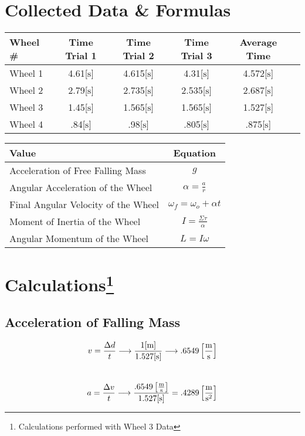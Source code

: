 \documentclass{article}
\begin{document}
\section{Collected Data \& Formulas}
\vspace{24pt}
\begin{center}
\large \begin{tabular}{|l|c|c|c|c|c|}
\hline
Wheel \# & Time Trial 1 & Time Trial 2 & Time Trial 3 & Average Time \\
\hline
Wheel 1 & 4.61[$\si{\second}$] & 4.615[$\si{\second}$] & 4.31[$\si{\second}$] & 4.572[$\si{\second}$]\\
\hline
Wheel 2 & 2.79[$\si{\second}$] & 2.735[$\si{\second}$] & 2.535[$\si{\second}$] & 2.687[$\si{\second}$]\\
\hline
Wheel 3 & 1.45[$\si{\second}$] & 1.565[$\si{\second}$] & 1.565[$\si{\second}$] & 1.527[$\si{\second}$]\\
\hline
Wheel 4 & .84[$\si{\second}$] & .98[$\si{\second}$] & .805[$\si{\second}$] & .875[$\si{\second}$]\\
\hline
\end{tabular}

\large
\vspace{24pt}
\begin{tabular}{|l|c|}
\hline
    Value & Equation \\
    \hline
    Acceleration of Free Falling Mass & $g$\\
    \hline
    Angular Acceleration of the Wheel & $\alpha = \frac{a}{r}$\\
    \hline
    Final Angular Velocity of the Wheel & $\omega_f = \omega_o+\alpha t$\\
    \hline
    Moment of Inertia of the Wheel & $I =\frac{ \Sigma \tau}{\alpha}$\\
    \hline
    Angular Momentum of the Wheel & $L=I\omega$\\
    \hline
\end{tabular}

\end{center}
\vspace{24pt}
\section{Calculations\protect\footnote{Calculations performed with Wheel 3 Data}}
\subsection{Acceleration of Falling Mass}
$$v = \frac{\Delta d}{t} \longrightarrow \frac{1[\si{\meter}]}{1.527[\si{\second}]} \longrightarrow .6549 \left[ \si{\frac{\meter}{\second}} \right]$$\\
$$a = \frac{\Delta v}{t}\longrightarrow \frac{.6549 \left[ \si{\frac{\meter}{\second}} \right]}{1.527[\si{\second}]}=.4289\left[\si{\frac{\meter}{\square\second}}\right]$$
\end{document}
